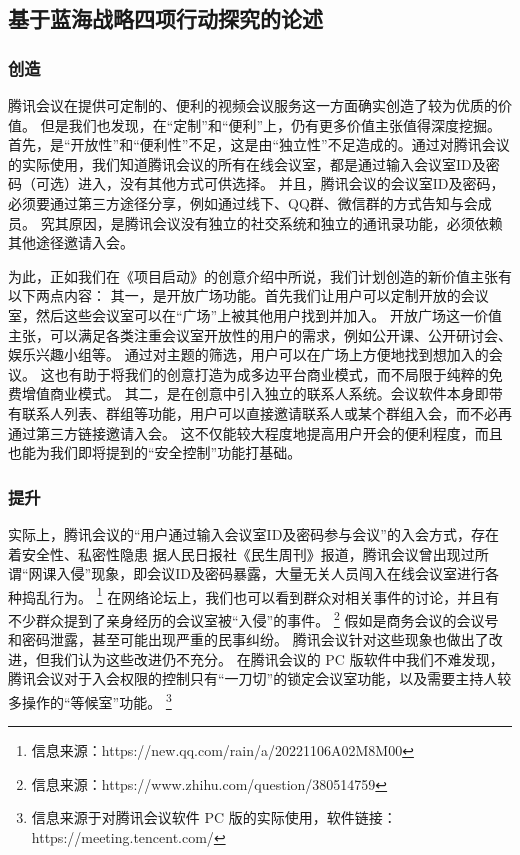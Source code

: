 \documentclass[a4paper,12pt]{article}
\begin{document}
    \subsection{基于蓝海战略四项行动探究的论述}
    \subsubsection{创造}
    腾讯会议在提供可定制的、便利的视频会议服务这一方面确实创造了较为优质的价值。
    但是我们也发现，在“定制”和“便利”上，仍有更多价值主张值得深度挖掘。
    首先，是“开放性”和“便利性”不足，这是由“独立性”不足造成的。通过对腾讯会议的实际使用，我们知道腾讯会议的所有在线会议室，都是通过输入会议室ID及密码（可选）进入，没有其他方式可供选择。
    并且，腾讯会议的会议室ID及密码，必须要通过第三方途径分享，例如通过线下、QQ群、微信群的方式告知与会成员。
    究其原因，是腾讯会议没有独立的社交系统和独立的通讯录功能，必须依赖其他途径邀请入会。


    为此，正如我们在《项目启动》的创意介绍中所说，我们计划创造的新价值主张有以下两点内容：
    其一，是开放广场功能。首先我们让用户可以定制开放的会议室，然后这些会议室可以在“广场”上被其他用户找到并加入。
    开放广场这一价值主张，可以满足各类注重会议室开放性的用户的需求，例如公开课、公开研讨会、娱乐兴趣小组等。
    通过对主题的筛选，用户可以在广场上方便地找到想加入的会议。
    这也有助于将我们的创意打造为成多边平台商业模式，而不局限于纯粹的免费增值商业模式。
    其二，是在创意中引入独立的联系人系统。会议软件本身即带有联系人列表、群组等功能，用户可以直接邀请联系人或某个群组入会，而不必再通过第三方链接邀请入会。
    这不仅能较大程度地提高用户开会的便利程度，而且也能为我们即将提到的“安全控制”功能打基础。

    \subsubsection{提升}

    实际上，腾讯会议的“用户通过输入会议室ID及密码参与会议”的入会方式，存在着安全性、私密性隐患
    据人民日报社《民生周刊》报道，腾讯会议曾出现过所谓“网课入侵”现象，即会议ID及密码暴露，大量无关人员闯入在线会议室进行各种捣乱行为。
    \footnote{信息来源：https://new.qq.com/rain/a/20221106A02M8M00}
    在网络论坛上，我们也可以看到群众对相关事件的讨论，并且有不少群众提到了亲身经历的会议室被“入侵”的事件。
    \footnote{信息来源：https://www.zhihu.com/question/380514759}
    假如是商务会议的会议号和密码泄露，甚至可能出现严重的民事纠纷。
    腾讯会议针对这些现象也做出了改进，但我们认为这些改进仍不充分。
    在腾讯会议的 PC 版软件中我们不难发现，腾讯会议对于入会权限的控制只有“一刀切”的锁定会议室功能，以及需要主持人较多操作的“等候室”功能。
    \footnote{信息来源于对腾讯会议软件 PC 版的实际使用，软件链接：https://meeting.tencent.com/}
\end{document}
